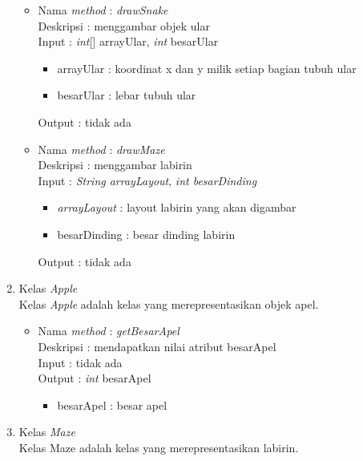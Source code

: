 \begin{enumerate}
\begin{itemize}
			\item Nama \textit{method} : \textit{drawSnake}\\
				  Deskripsi : menggambar objek ular\\
				  Input : \textit{int}[] arrayUlar, \textit{int} besarUlar
				  	\begin{itemize}
				  		\item arrayUlar : koordinat x dan y milik setiap bagian tubuh ular
				  		\item besarUlar : lebar tubuh ular
				  	\end{itemize}
				  Output : tidak ada\\
				  
			\item Nama \textit{method} : \textit{drawMaze}\\
				  Deskripsi : menggambar labirin\\
				  Input : \textit{String arrayLayout}, \textit{int besarDinding}
				  	\begin{itemize}
				  		\item \textit{arrayLayout} : layout labirin yang akan digambar
				  		\item besarDinding : besar dinding labirin
				  	\end{itemize}
				  Output : tidak ada\\
		\end{itemize}
		
	\item Kelas \textit{Apple}\\
	Kelas \textit{Apple} adalah kelas yang merepresentasikan objek apel.
	
		\begin{itemize}
			\item Nama \textit{method} : \textit{getBesarApel}\\
				  Deskripsi : mendapatkan nilai atribut besarApel\\
				  Input : tidak ada\\
				  Output : \textit{int} besarApel
				  	\begin{itemize}
				  		\item besarApel : besar apel
				  	\end{itemize}
		\end{itemize}
		
	\item Kelas \textit{Maze}\\
	Kelas Maze adalah kelas yang merepresentasikan labirin.
	

\end{enumerate}
